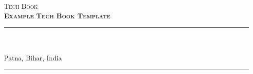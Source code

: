 \begin{titlepage}
    \colorbox{black!5}{
        \parbox[t]{0.975\textwidth}{%
            \parbox[t]{0.95\textwidth}{%
                \raggedleft\vspace{0.75cm}\Huge\scshape
                Tech Book \\[7.5pt]
                \large\bf Example Tech Book Template
                \vspace{0.75cm}
            }
        }
    }

    \vfill

    \parbox[t]{0.95\textwidth}{%
        \hfill\rule{0.15\linewidth}{0.5pt}\\[7.5pt]
        \raggedleft
        \textcopyright{}\\[4pt]
        
        \normalsize\textsuperscript{\textdagger} Patna, Bihar, India\\

        \hfill\rule{0.15\linewidth}{0.5pt}
    }
\end{titlepage}
